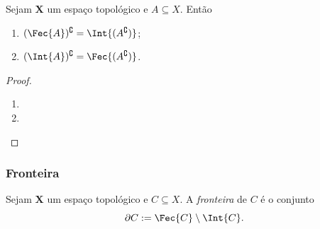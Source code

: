 \begin{prop}
	Sejam $\bm X$ um espaço topológico e $A \subseteq X$. Então
	\begin{enumerate}
	\item $(\Fec{A})^\complement = \Int{(A^\complement)}$;
	\item $(\Int{A})^\complement = \Fec{(A^\complement)}$.
	\end{enumerate}
\end{prop}
\begin{proof}
	\begin{enumerate}
	\item
	\item
	\end{enumerate}
\end{proof}


\subsubsection{Fronteira}

\begin{defi}
	Sejam $\bm X$ um espaço topológico e $C \subseteq X$. A \emph{fronteira} de $C$ é o conjunto
	\begin{equation*}
	\fro{C} := \Fec{C} \setminus \Int{C}.
	\end{equation*}
\end{defi}

